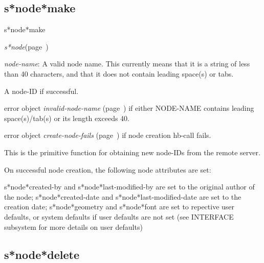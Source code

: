 \subsection{s*node*make}
\label{s*node*make}

\begin{description}
\item [Name:]  s*node*make

\item [Class:] {\sl s*node}\hfill(page~\pageref{s*node})

\item [Parameters:]
\item {\sl node-name}:  
A valid node name. This currently means that it is a
string of less than 40 characters, and that it does
not contain leading space(s) or tabs.
  

\item [Return-value:] 
A node-ID if successful.

error object {\sl invalid-node-name} (page~\pageref{invalid-node-name}) if either
NODE-NAME contains leading space(s)/tab(s) or its
length exceeds 40.

error object {\sl create-node-fails} (page~\pageref{create-node-fails}) if node
creation hb-call fails.

\item [Description:]
This is the primitive function for obtaining
new node-IDs from the remote server.

On successful node creation, the following node
attributes are set:

s*node*created-by and s*node*last-modified-by
are set to the original author of the node;
s*node*created-date and s*node*last-modified-date
are set to the creation date; s*node*geometry and s*node*font
are set to repective user defaults, or system defaults if
user defaults are not set (see INTERFACE subsystem for more
details on user defaults)

\item [Public:]





\end{description}
\horizontalline

\subsection{s*node*delete}
\label{s*node*delete}

